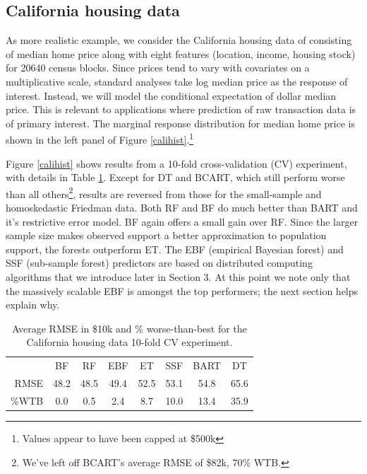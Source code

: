 \documentclass{article}
\begin{document}
\subsection{California housing data}\label{california-housing-data}

As more realistic example, we consider the California housing data of \citet{calidata}
consisting of median home price along with eight features (location, income, housing stock) for 20640  census blocks. Since prices tend to vary with covariates on a multiplicative scale, standard analyses take  log median price as the response of
interest.  Instead, we will model the conditional expectation of
dollar median price.  This is relevant to applications where prediction of raw transaction data is of primary interest.  The marginal response distribution for median home price is shown in the left panel of  Figure \ref{calihist}.\footnote{Values appear to have been capped at \$500k}



Figure \ref{calihist} shows results from a 10-fold cross-validation (CV)
experiment, with details in Table \ref{calitab}.  
Except for DT and BCART, which still perform worse than all 
others\footnote{We've left off BCART's average RMSE of \$82k, 70\% WTB.},
 results are reversed from those for the small-sample and homoskedastic Friedman data.
Both RF and BF do much better than BART and it's
restrictive error model.   BF again offers a small
gain over RF.   Since the larger sample size makes observed support a better approximation to population support,  the forests outperform ET.  The EBF (empirical Bayesian forest) and SSF (sub-sample forest) predictors are based on distributed computing algorithms that we introduce later in Section 3.  At this point we note only that the massively scalable EBF is amongst the top performers; the next section helps explain why.


\begin{table}[h]\hspace{-.25cm}
{\footnotesize
\begin{tabular}{r|c c c c c c c}
&BF  &  RF &   EBF &  ET &   SSF &  BART & DT %
\\ \cline{2-8}\rule{0pt}{3ex}
RMSE &  48.2 &   48.5 &   49.4 &   52.5 &   53.1 &   54.8 &   65.6   %
\\ \%WTB & 0.0& 0.5& 2.4& 8.7&10.0&13.4&35.9%
\end{tabular}}
\caption{\label{calitab} Average RMSE in \$10k and \% worse-than-best 
 for the California housing data 10-fold CV experiment.}
\end{table}
\end{document}
